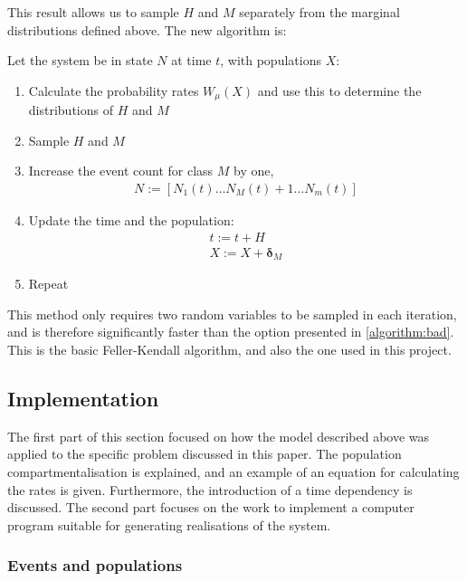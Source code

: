 \documentclass[10pt,a4paper]{article}
\begin{document}
This result allows us to sample $H$ and $M$ separately from the marginal distributions defined above. The new algorithm is:

\begin{algorithm} Let the system be in state $N$ at time $t$, with populations $X$:
	\begin{enumerate}
		\item Calculate the probability rates $W_\mu \left( X \right)$ and use this to determine the distributions of $H$ and $M$
		\item Sample $H$ and $M$
		\item Increase the event count for class $M$ by one,
			\begin{align*}
				N := \left[ N_1 \left( t \right) \ldots N_{M} \left( t \right) + 1 \ldots N_m \left( t \right) \right]
			\end{align*}
		\item Update the time and the population:
			\begin{align*}
				t := t + H\\
				X := X + \bm{\delta}_M
			\end{align*}
		\item Repeat
	\end{enumerate} \label{algorithm:good}
\end{algorithm}

This method only requires two random variables to be sampled in each iteration, and is therefore significantly faster than the option presented in \cref{algorithm:bad}. This is the basic Feller-Kendall algorithm, and also the one used in this project.


\subsection{Implementation}

The first part of this section focused on how the model described above was applied to the specific problem discussed in this paper. The population compartmentalisation is explained, and an example of an equation for calculating the rates is given. Furthermore, the introduction of a time dependency is discussed. The second part focuses on the work to implement a computer program suitable for generating realisations of the system.


\subsubsection{Events and populations} \label{section:populations}
\end{document}
